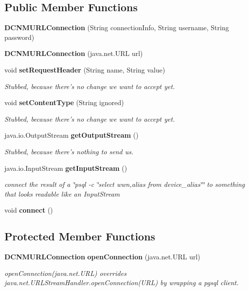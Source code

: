 \subsection*{Public Member Functions}
\begin{DoxyCompactItemize}
\item 
{\bf D\+C\+N\+M\+U\+R\+L\+Connection} (String connection\+Info, String username, String password)
\item 
{\bf D\+C\+N\+M\+U\+R\+L\+Connection} (java.\+net.\+U\+R\+L url)
\item 
void {\bf set\+Request\+Header} (String name, String value)
\begin{DoxyCompactList}\small\item\em Stubbed, because there's no change we want to accept yet. \end{DoxyCompactList}\item 
void {\bf set\+Content\+Type} (String ignored)
\begin{DoxyCompactList}\small\item\em Stubbed, because there's no change we want to accept yet. \end{DoxyCompactList}\item 
java.\+io.\+Output\+Stream {\bf get\+Output\+Stream} ()
\begin{DoxyCompactList}\small\item\em Stubbed, because there's nothing to send us. \end{DoxyCompactList}\item 
java.\+io.\+Input\+Stream {\bf get\+Input\+Stream} ()
\begin{DoxyCompactList}\small\item\em connect the result of a \char`\"{}psql -\/c \char`\"{}select wwn,alias from device\+\_\+alias\char`\"{}\char`\"{} to something that looks readable like an Input\+Stream \end{DoxyCompactList}\item 
void {\bf connect} ()
\end{DoxyCompactItemize}
\subsection*{Protected Member Functions}
\begin{DoxyCompactItemize}
\item 
{\bf D\+C\+N\+M\+U\+R\+L\+Connection} {\bf open\+Connection} (java.\+net.\+U\+R\+L url)
\begin{DoxyCompactList}\small\item\em open\+Connection(java.\+net.\+U\+R\+L) overrides java.\+net.\+U\+R\+L\+Stream\+Handler.\+open\+Connection(\+U\+R\+L) by wrapping a pgsql client. \end{DoxyCompactList}\end{DoxyCompactItemize}


